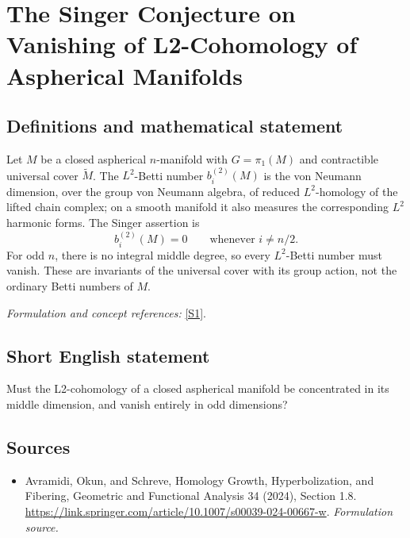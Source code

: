 \documentclass[11pt]{article}
\begin{document}
\section*{\texorpdfstring{The Singer Conjecture on Vanishing of L2-Cohomology of Aspherical Manifolds}{The Singer Conjecture on Vanishing of L2-Cohomology of Aspherical Manifolds}}\label{259}
\subsection{Definitions and mathematical statement}
Let $M$ be a closed aspherical $n$-manifold with $G=\pi_1(M)$ and contractible universal cover $\widetilde M$. The $L^2$-Betti number $b_i^{(2)}(M)$ is the von Neumann dimension, over the group von Neumann algebra, of reduced $L^2$-homology of the lifted chain complex; on a smooth manifold it also measures the corresponding $L^2$ harmonic forms. The Singer assertion is
\[
 b_i^{(2)}(M)=0\qquad\text{whenever }i\ne n/2.
\]
For odd $n$, there is no integral middle degree, so every $L^2$-Betti number must vanish. These are invariants of the universal cover with its group action, not the ordinary Betti numbers of $M$.
\par\smallskip\textit{Formulation and concept references:} \href{https://link.springer.com/article/10.1007/s00039-024-00667-w}{[S1]}.

\subsection{Short English statement}
Must the L2-cohomology of a closed aspherical manifold be concentrated in its middle dimension, and vanish entirely in odd dimensions?
\subsection{Sources}
\begin{itemize}
\item[S1]Avramidi, Okun, and Schreve, Homology Growth, Hyperbolization, and Fibering, Geometric and Functional Analysis 34 (2024), Section 1.8.
\url{https://link.springer.com/article/10.1007/s00039-024-00667-w}.
\textit{Formulation source.}
\end{itemize}
\end{document}
